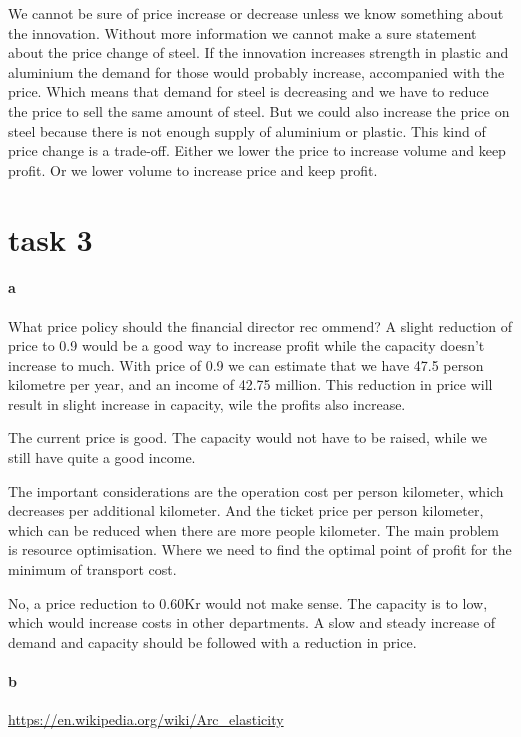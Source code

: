 \documentclass[12pt, a4paper]{article}
\begin{document}
We cannot be sure of price increase or decrease unless we know something about
the innovation. Without more information we cannot make a sure statement about
the price change of steel. If the innovation increases strength in plastic and
aluminium the demand for those would probably increase, accompanied with the
price. Which means that demand for steel is decreasing and we have to reduce
the price to sell the same amount of steel. But we could also increase the
price on steel because there is not enough supply of aluminium or plastic. 
This kind of price change is a trade-off. Either we lower the price to increase
volume and keep profit. Or we lower volume to increase price and keep profit. 

\section{task 3}

\paragraph{a}
What price policy should the financial director rec
ommend? 
A slight reduction of price to 0.9 would be a good way to increase profit while
the capacity doesn't increase to much. With price of 0.9 we can estimate that
we have 47.5 person kilometre per year, and an income of 42.75 million. This
reduction in price will result in slight increase in capacity, wile the profits
also increase. 

The current price is good. The capacity would not have to be raised, while
we still have quite a good income. 

The important considerations are the operation cost per person kilometer, which
decreases per additional kilometer. And the ticket price per person kilometer,
which can be reduced when there are more people kilometer. The main problem is
resource optimisation. Where we need to find the optimal point of profit for
the minimum of transport cost.  

No, a price reduction to 0.60Kr would not make sense. The capacity is to low,
which would increase costs in other departments. A slow and steady increase
of demand and capacity should be followed with a reduction in price.

\paragraph{b}
\url{https://en.wikipedia.org/wiki/Arc_elasticity}
\end{document}
